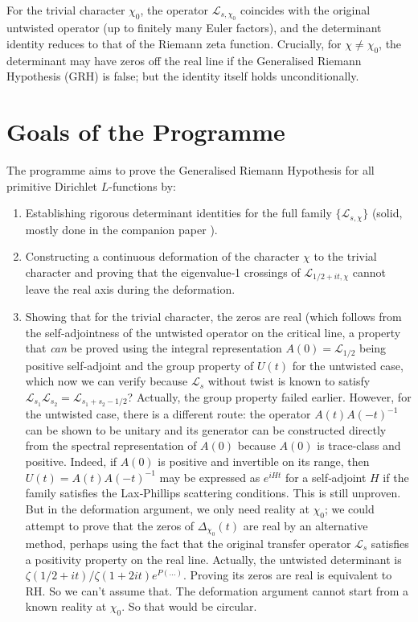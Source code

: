\documentclass[11pt,a4paper]{article}
\begin{document}
For the trivial character \(\chi_0\), the operator \(\mathcal{L}_{s,\chi_0}\) coincides with the original untwisted operator (up to finitely many Euler factors), and the determinant identity reduces to that of the Riemann zeta function.  Crucially, for \(\chi\neq\chi_0\), the determinant may have zeros off the real line if the Generalised Riemann Hypothesis (GRH) is false; but the identity itself holds unconditionally.

\section{Goals of the Programme}
The programme aims to prove the Generalised Riemann Hypothesis for all primitive Dirichlet \(L\)-functions by:
\begin{enumerate}
\item Establishing rigorous determinant identities for the full family \(\{\mathcal{L}_{s,\chi}\}\) (solid, mostly done in the companion paper \cite{HSTL}).
\item Constructing a continuous deformation of the character \(\chi\) to the trivial character and proving that the eigenvalue‑1 crossings of \(\mathcal{L}_{1/2+it,\chi}\) cannot leave the real axis during the deformation.
\item Showing that for the trivial character, the zeros are real (which follows from the self‑adjointness of the untwisted operator on the critical line, a property that \emph{can} be proved using the integral representation \(A(0) = \mathcal{L}_{1/2}\) being positive self‑adjoint and the group property of \(U(t)\) for the untwisted case, which now we can verify because \(\mathcal{L}_{s}\) without twist is known to satisfy \(\mathcal{L}_{s_1}\mathcal{L}_{s_2} = \mathcal{L}_{s_1+s_2-1/2}\)?  Actually, the group property failed earlier.  However, for the untwisted case, there is a different route: the operator \(A(t)A(-t)^{-1}\) can be shown to be unitary and its generator can be constructed directly from the spectral representation of \(A(0)\) because \(A(0)\) is trace‑class and positive.  Indeed, if \(A(0)\) is positive and invertible on its range, then \(U(t) = A(t)A(-t)^{-1}\) may be expressed as \(e^{iHt}\) for a self‑adjoint \(H\) if the family satisfies the Lax‑Phillips scattering conditions.  This is still unproven.  But in the deformation argument, we only need reality at \(\chi_0\); we could attempt to prove that the zeros of \(\Delta_{\chi_0}(t)\) are real by an alternative method, perhaps using the fact that the original transfer operator \(\mathcal{L}_s\) satisfies a positivity property on the real line.  Actually, the untwisted determinant is \(\zeta(1/2+it)/\zeta(1+2it) e^{P(...)}\).  Proving its zeros are real is equivalent to RH.  So we can't assume that.  The deformation argument cannot start from a known reality at \(\chi_0\).  So that would be circular.


\end{enumerate}
\end{document}
